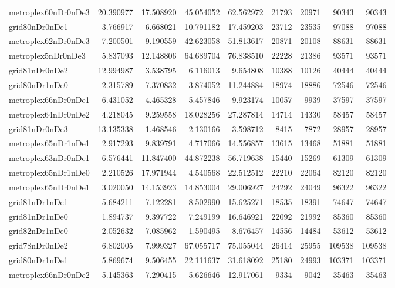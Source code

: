 \begin{longtable}{|l|r|r|r|r|r|r|r|r|}
metroplex60nDr0nDe3 & 20.390977 & 17.508920 & 45.054052 & 62.562972 & 21793 & 20971 & 90343 & 90343 \\
grid80nDr0nDe1 & 3.766917 & 6.668021 & 10.791182 & 17.459203 & 23712 & 23535 & 97088 & 97088 \\
metroplex62nDr0nDe3 & 7.200501 & 9.190559 & 42.623058 & 51.813617 & 20871 & 20108 & 88631 & 88631 \\
metroplex5nDr0nDe3 & 5.837093 & 12.148806 & 64.689704 & 76.838510 & 22228 & 21386 & 93571 & 93571 \\
grid81nDr0nDe2 & 12.994987 & 3.538795 & 6.116013 & 9.654808 & 10388 & 10126 & 40444 & 40444 \\
grid80nDr1nDe0 & 2.315789 & 7.370832 & 3.874052 & 11.244884 & 18974 & 18886 & 72546 & 72546 \\
metroplex66nDr0nDe1 & 6.431052 & 4.465328 & 5.457846 & 9.923174 & 10057 & 9939 & 37597 & 37597 \\
metroplex64nDr0nDe2 & 4.218045 & 9.259558 & 18.028256 & 27.287814 & 14714 & 14330 & 58457 & 58457 \\
grid81nDr0nDe3 & 13.135338 & 1.468546 & 2.130166 & 3.598712 & 8415 & 7872 & 28957 & 28957 \\
metroplex65nDr1nDe1 & 2.917293 & 9.839791 & 4.717066 & 14.556857 & 13615 & 13468 & 51881 & 51881 \\
metroplex63nDr0nDe1 & 6.576441 & 11.847400 & 44.872238 & 56.719638 & 15440 & 15269 & 61309 & 61309 \\
metroplex65nDr1nDe0 & 2.210526 & 17.971944 & 4.540568 & 22.512512 & 22210 & 22064 & 82120 & 82120 \\
metroplex65nDr0nDe1 & 3.020050 & 14.153923 & 14.853004 & 29.006927 & 24292 & 24049 & 96322 & 96322 \\
grid81nDr1nDe1 & 5.684211 & 7.122281 & 8.502990 & 15.625271 & 18535 & 18391 & 74647 & 74647 \\
grid81nDr1nDe0 & 1.894737 & 9.397722 & 7.249199 & 16.646921 & 22092 & 21992 & 85360 & 85360 \\
grid82nDr1nDe0 & 2.052632 & 7.085962 & 1.590495 & 8.676457 & 14556 & 14484 & 53612 & 53612 \\
grid78nDr0nDe2 & 6.802005 & 7.999327 & 67.055717 & 75.055044 & 26414 & 25955 & 109538 & 109538 \\
grid80nDr1nDe1 & 5.869674 & 9.506455 & 22.111637 & 31.618092 & 25180 & 24993 & 103371 & 103371 \\
metroplex66nDr0nDe2 & 5.145363 & 7.290415 & 5.626646 & 12.917061 & 9334 & 9042 & 35463 & 35463 \\

\end{longtable}
